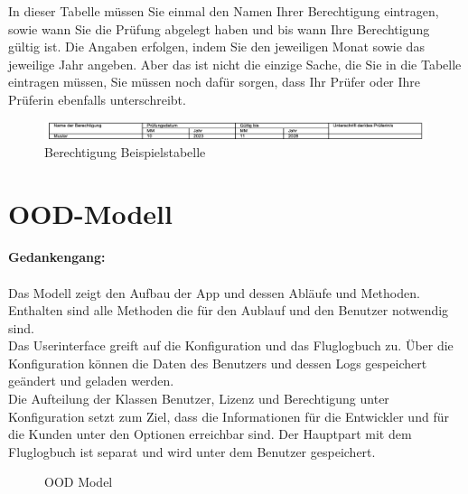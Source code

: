 \documentclass[a4paper]{article} %
\begin{document}
    \pagebreak
    
    \noindent In dieser Tabelle müssen Sie einmal den Namen Ihrer Berechtigung eintragen, sowie wann Sie die Prüfung abgelegt haben und bis wann Ihre Berechtigung gültig ist. Die Angaben erfolgen, indem Sie den jeweiligen Monat sowie das jeweilige Jahr angeben. Aber das ist nicht die einzige Sache, die Sie in die Tabelle eintragen müssen, Sie müssen noch dafür sorgen, dass Ihr Prüfer oder Ihre Prüferin ebenfalls unterschreibt.\\
    
    \begin{figure}[h!]
        \centering
        \includegraphics[width=17cm]{Berechtigung_Beispiel.png}
        \caption{Berechtigung Beispielstabelle}
        \label{fig:my_label}
    \end{figure}
    
    \section{OOD-Modell}

    \vspace{1cm}
    \noindent \textbf{Gedankengang:}\\
    \noindent \vspace{0.5cm} \\
    \noindent Das Modell zeigt den Aufbau der App und dessen Abläufe und Methoden. Enthalten sind alle Methoden die für den Aublauf und den Benutzer notwendig sind. \\Das Userinterface greift auf die Konfiguration und das Fluglogbuch zu. Über die Konfiguration können die Daten des Benutzers und dessen Logs gespeichert geändert und geladen werden.\\ Die Aufteilung der Klassen Benutzer, Lizenz und Berechtigung unter Konfiguration setzt zum Ziel, dass die Informationen für die Entwickler und für die Kunden unter den Optionen erreichbar sind. Der Hauptpart mit dem Fluglogbuch ist separat und wird unter dem Benutzer gespeichert.
    \pagebreak
    
    \begin{figure}[h!]
    \centering
    \caption{OOD Model}
    \label{fig:my_label}
    \end{figure}
    \pagebreak
\end{document}
